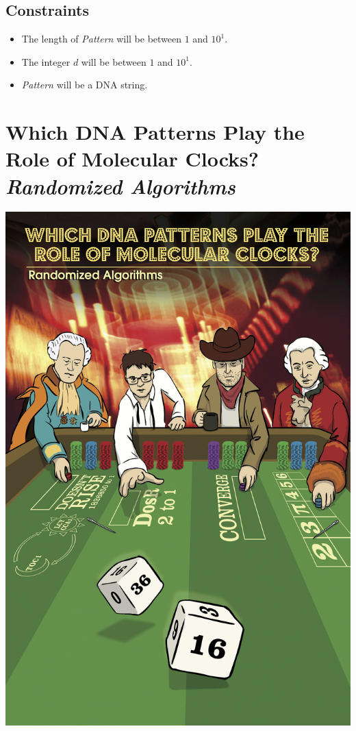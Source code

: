 \documentclass{article}
\begin{document}
\subsection*{Constraints}
\begin{itemize}
    \item The length of \emph{Pattern} will be between $1$ and $10^1$.
    \item The integer $d$ will be between $1$ and $10^1$.
    \item \emph{Pattern} will be a DNA string.
\end{itemize}
\pagebreak
\section{Which DNA Patterns Play the Role of Molecular Clocks?\\ \normalfont\emph{Randomized Algorithms}}
\begin{center}
    \includegraphics[scale=0.72]{c2/c2.jpg}
\end{center}
\pagebreak
\end{document}
